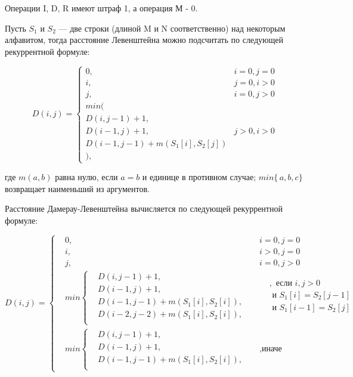 \documentclass[utf8x, 12pt]{G7-32}
\begin{document}
Операции I, D, R имеют штраф 1, а операция М - 0.

Пусть $S_{1}$ и $S_{2}$ — две строки (длиной M и N соответственно) над некоторым алфавитом, тогда расстояние Левенштейна можно подсчитать по следующей рекуррентной формуле:

\begin{displaymath}
D(i,j) = \left\{ \begin{array}{ll}
 0, & \textrm{$i = 0, j = 0$}\\
 i, & \textrm{$j = 0, i > 0$}\\
 j, & \textrm{$i = 0, j > 0$}\\
min(\\
D(i,j-1)+1,\\
D(i-1, j) +1, &\textrm{$j>0, i>0$}\\
D(i-1, j-1) + m(S_{1}[i], S_{2}[j])\\
),
  \end{array} \right.
\end{displaymath}

где $m(a,b)$ равна нулю, если $a=b$ и единице в противном случае; $min\{\,a,b,c\}$ возвращает наименьший из аргументов.

Расстояние Дамерау-Левенштейна вычисляется по следующей рекуррентной формуле:
		    
		     \[ D(i, j) =  \left\{
			\begin{aligned}
				&0, && i = 0, j = 0\\
		    	&i, && i > 0, j = 0\\
		    	&j, && i = 0, j > 0\\		    	
		    	&min \left\{
				\begin{aligned}
					&D(i, j - 1) + 1,\\
		            &D(i - 1, j) + 1,\\
		            &D(i - 1, j - 1) + m(S_{1}[i], S_{2}[i]), \\
		            &D(i - 2, j - 2) + m(S_{1}[i], S_{2}[i]),\\
		        \end{aligned} \right.
		        && 
				\begin{aligned}
					&, \text{ если } i, j > 0 \\
		            & \text{ и } S_{1}[i] = S_{2}[j - 1] \\
		            & \text{ и } S_{1}[i - 1] =  S_{2}[j] \\
		        \end{aligned} \\ 
		        &min \left\{
		        \begin{aligned}
		            &D(i, j - 1) + 1,\\
		            &D(i - 1, j) + 1, \\
		            &D(i - 1, j - 1) + m(S_{1}[i], S_{2}[i]),\\
		        \end{aligned} \right.  &&, \text{иначе}
			\end{aligned} \right.
			\]	
	    
\end{document}
